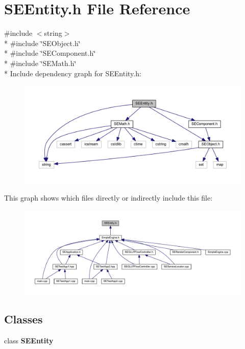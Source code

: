 \section{S\+E\+Entity.\+h File Reference}
\label{_s_e_entity_8h}
{\ttfamily \#include $<$string$>$}\\*
{\ttfamily \#include \char`\"{}S\+E\+Object.\+h\char`\"{}}\\*
{\ttfamily \#include \char`\"{}S\+E\+Component.\+h\char`\"{}}\\*
{\ttfamily \#include \char`\"{}S\+E\+Math.\+h\char`\"{}}\\*
Include dependency graph for S\+E\+Entity.\+h\+:
\nopagebreak
\begin{figure}[H]
\begin{center}
\leavevmode
\includegraphics[width=350pt]{_s_e_entity_8h__incl}
\end{center}
\end{figure}
This graph shows which files directly or indirectly include this file\+:
\nopagebreak
\begin{figure}[H]
\begin{center}
\leavevmode
\includegraphics[width=350pt]{_s_e_entity_8h__dep__incl}
\end{center}
\end{figure}
\subsection*{Classes}
\begin{DoxyCompactItemize}
\item 
class {\bf S\+E\+Entity}
\end{DoxyCompactItemize}
